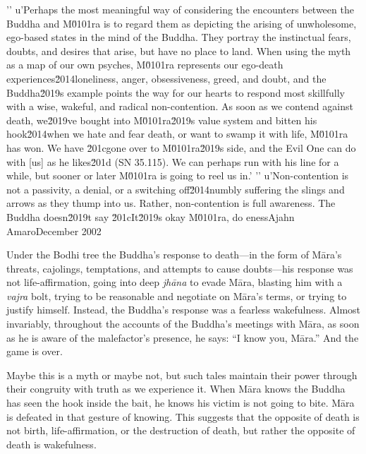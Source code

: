 {'\n'
u'Perhaps the most meaningful way of considering the encounters between the Buddha and M\u0101ra is to regard them as depicting the arising of unwholesome, ego-based states in the mind of the Buddha. They portray the instinctual fears, doubts, and desires that arise, but have no place to land. When using the myth as a map of our own psyches, M\u0101ra represents our ego-death experiences\u2014loneliness, anger, obsessiveness, greed, and doubt, and the Buddha\u2019s example points the way for our hearts to respond most skillfully with a wise, wakeful, and radical non-contention. As soon as we contend against death, we\u2019ve bought into M\u0101ra\u2019s value system and bitten his hook\u2014when we hate and fear death, or want to swamp it with life, M\u0101ra has won. We have \u201cgone over to M\u0101ra\u2019s side, and the Evil One can do with [us] as he likes\u201d (SN 35.115). We can perhaps run with his line for a while, but sooner or later M\u0101ra is going to reel us in.'
'\n'
u'Non-contention is not a passivity, a denial, or a switching off\u2014numbly suffering the slings and arrows as they thump into us. Rather, non-contention is full awareness. The Buddha doesn\u2019t say \u201cIt\u2019s okay M\u0101ra, do eness}{Ajahn Amaro}{December 2002}

Under the Bodhi tree the Buddha's response to death---in the form of 
Māra's threats, cajolings, temptations, and attempts to cause 
doubts---his response was not life-affirmation, going into deep 
\emph{jhāna} to evade Māra, blasting him with a \emph{vajra} bolt, 
trying to be reasonable and negotiate on Māra's terms, or trying to 
justify himself. Instead, the Buddha's response was a fearless 
wakefulness. Almost invariably, throughout the accounts of the Buddha's 
meetings with Māra, as soon as he is aware of the malefactor's 
presence, he says: ``I know you, Māra.'' And the game is over.

Maybe this is a myth or maybe not, but such tales maintain their power 
through their congruity with truth as we experience it. When Māra 
knows the Buddha has seen the hook inside the bait, he knows his victim 
is not going to bite. Māra is defeated in that gesture of knowing. 
This suggests that the opposite of death is not birth, 
life-affirmation, or the destruction of death, but rather the opposite 
of death is wakefulness.

